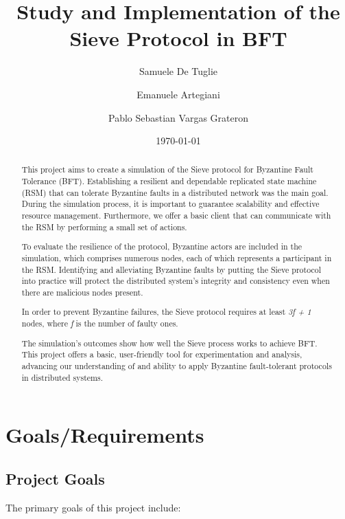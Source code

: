 \documentclass{scrartcl}
\title{\LARGE
    Study and Implementation of the Sieve Protocol in BFT
}
\author{
    Samuele De Tuglie \\ \emailaddr{samuele.detuglie@studio.unibo.it}
    \and 
    Emanuele Artegiani \\ \emailaddr{emanuele.artegiani@studio.unibo.it} 
    \and 
    Pablo Sebastian Vargas Grateron \\ \emailaddr{pablo.vargasgrateron@studio.unibo.it}
}
\date{\today}
\begin{document}
\maketitle

\begin{abstract}
This project aims to create a simulation of the Sieve protocol for Byzantine Fault Tolerance (BFT). Establishing a resilient and dependable replicated state machine (RSM) that can tolerate Byzantine faults in a distributed network was the main goal. During the simulation process, it is important to guarantee scalability and effective resource management. Furthermore, we offer a basic client that can communicate with the RSM by performing a small set of actions.

To evaluate the resilience of the protocol, Byzantine actors are included in the simulation, which comprises numerous nodes, each of which represents a participant in the RSM. Identifying and alleviating Byzantine faults by putting the Sieve protocol into practice will protect the distributed system's integrity and consistency even when there are malicious nodes present.

In order to prevent Byzantine failures, the Sieve protocol requires at least \textit{3f + 1} nodes, where \textit{f} is the number of faulty ones.

The simulation's outcomes show how well the Sieve process works to achieve BFT. This project offers a basic, user-friendly tool for experimentation and analysis, advancing our understanding of and ability to apply Byzantine fault-tolerant protocols in distributed systems.
\end{abstract}


\newpage


\section{Goals/Requirements}

\subsection{Project Goals}

The primary goals of this project include:
\end{document}
